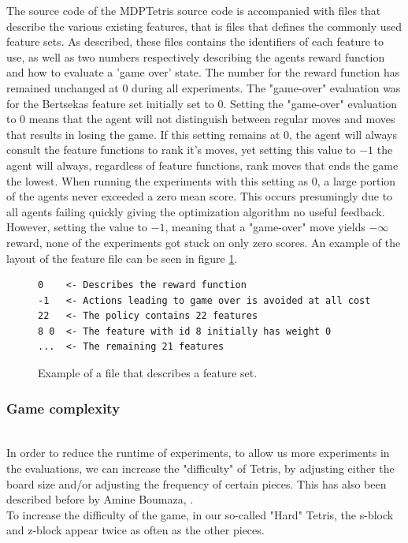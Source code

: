 The source code of the MDPTetris source code 
is accompanied with files that describe the
various existing features, that is files that defines 
the commonly used feature sets. As described, these files contains the identifiers of 
each feature to use, as well as two numbers respectively describing 
the agents reward function and how to evaluate a 'game over' state. 
The number for the reward function has remained unchanged at $0$ 
during all experiments. The "game-over" evaluation was for the
Bertsekas feature set initially set to $0$. Setting the 
"game-over" evaluation to $0$ means that the agent will not 
distinguish between regular moves and moves that results in losing
the game. If this setting remains at 0, the agent will always consult the
feature functions to rank it's moves, yet setting this value to $-1$
the agent will always, regardless of feature functions, rank moves that ends
the game the lowest.
When running the experiments with this setting as $0$, a large portion
of the agents never exceeded a zero mean score. This occurs presumingly 
due to all agents failing quickly giving the optimization algorithm no 
useful feedback. However, setting the value
to $-1$, meaning that a "game-over" move yields $-\infty$ reward, 
none of the experiments got stuck on only zero scores. An example
of the layout of the feature file can be seen in figure \ref{fig:featfile}.
\begin{figure}[h!]
\centering
\begin{lstlisting}
0    <- Describes the reward function
-1   <- Actions leading to game over is avoided at all cost
22   <- The policy contains 22 features
8 0  <- The feature with id 8 initially has weight 0
...  <- The remaining 21 features
\end{lstlisting}
\caption{Example of a file that describes a feature set. \label{fig:featfile}}
\end{figure}

\subsubsection{Game complexity \label{HardTetris}}
\\
In order to reduce the runtime of experiments, to allow us more experiments in the evaluations, we can increase the "difficulty" of Tetris, by adjusting either the board size and/or adjusting the frequency of certain pieces. This has also been described before by Amine Boumaza, \citep{boumaza2009}.\\
To increase the difficulty of the game,
in our so-called "Hard" Tetris, the s-block and z-block appear twice as often 
as the other pieces.

